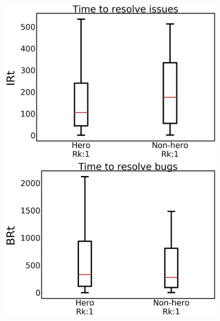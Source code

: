 \documentclass[sigconf]{acmart}
\theoremstyle{break}
\begin{document}
\begin{figure}[!t]
\begin{minipage}{.33\linewidth}
\centering
         \includegraphics[width=\linewidth,keepaspectratio]{./fig/IRt.png}
    \end{minipage}%
\begin{minipage}{.33\linewidth}
        \centering
        \includegraphics[width=\linewidth]{./fig/BRt.png}
    \end{minipage}%
\begin{minipage}{.33\linewidth}
        \centering

\end{minipage}
\end{figure}
\end{document}
